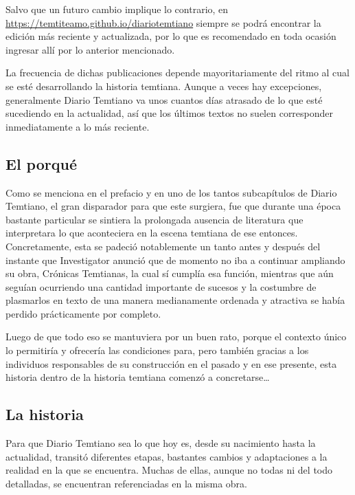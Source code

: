 \documentclass[
  spanish,
]{book}
\begin{document}
Salvo que un futuro cambio implique lo contrario, en \url{https://temtiteamo.github.io/diariotemtiano} siempre se podrá encontrar la edición más reciente y actualizada, por lo que es recomendado en toda ocasión ingresar allí por lo anterior mencionado.

La frecuencia de dichas publicaciones depende mayoritariamente del ritmo al cual se esté desarrollando la historia temtiana. Aunque a veces hay excepciones, generalmente Diario Temtiano va unos cuantos días atrasado de lo que esté sucediendo en la actualidad, así que los últimos textos no suelen corresponder inmediatamente a lo más reciente.

\hypertarget{el-porquuxe9}{%
\subsection*{El porqué}\label{el-porquuxe9}}

Como se menciona en el prefacio y en uno de los tantos subcapítulos de Diario Temtiano, el gran disparador para que este surgiera, fue que durante una época bastante particular se sintiera la prolongada ausencia de literatura que interpretara lo que aconteciera en la escena temtiana de ese entonces. Concretamente, esta se padeció notablemente un tanto antes y después del instante que Investigator anunció que de momento no iba a continuar ampliando su obra, Crónicas Temtianas, la cual sí cumplía esa función, mientras que aún seguían ocurriendo una cantidad importante de sucesos y la costumbre de plasmarlos en texto de una manera medianamente ordenada y atractiva se había perdido prácticamente por completo.

Luego de que todo eso se mantuviera por un buen rato, porque el contexto único lo permitiría y ofrecería las condiciones para, pero también gracias a los individuos responsables de su construcción en el pasado y en ese presente, esta historia dentro de la historia temtiana comenzó a concretarse\ldots{}

\hypertarget{la-historia}{%
\subsection*{La historia}\label{la-historia}}

Para que Diario Temtiano sea lo que hoy es, desde su nacimiento hasta la actualidad, transitó diferentes etapas, bastantes cambios y adaptaciones a la realidad en la que se encuentra. Muchas de ellas, aunque no todas ni del todo detalladas, se encuentran referenciadas en la misma obra.
\end{document}
